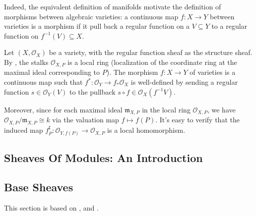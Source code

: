 \documentclass[11pt]{article}
\begin{document}
Indeed, the equivalent definition of manifolds motivate the definition of morphisms between algebraic 
varieties: a continuous map $ f:X \to Y $  between varieties is a morphism if it pull back a regular function on 
a $ V \subseteq Y$ to a regular function on $ f^{-1}(V) \subseteq X $. 

\begin{example}
  Let $ (X, \mathscr{O}_{X}) $ be a variety, with the regular function sheaf as the structure sheaf. 
  By \cite[Theorem 3.2, 3.4]{hartsAG}, the stalks $ \mathscr{O}_{X,P} $ is a local ring 
  (localization of the coordinate ring at the maximal ideal corresponding to $ P $). 
  The morphism $ f: X \to Y $ of varieties is a continuous map such that 
  $ f^{*} : \mathscr{O}_{Y} \to f_{*}\mathscr{O}_{X} $ is well-defined by sending a regular function 
  $ s \in \mathscr{O}_{Y}(V) $ to the pullback $ s \circ f \in \mathscr{O}_{X}(f^{-1}V) $. 

  Moreover, since for each maximal ideal $ \mathfrak{m}_{X,P} $ in the local ring $ \mathscr{O}_{X,P} $, 
  we have $  \mathscr{O}_{X,P} / \mathfrak{m}_{X,P} \cong k $ via the valuation map $ f \mapsto f(P) $. 
  It's easy to verify that the induced map $ f^{\sharp}_{P}: \mathscr{O}_{Y,f(P)} \to \mathscr{O}_{X,P} $ 
  is a local homomorphism. 
\end{example}

\subsection{Sheaves Of Modules: An Introduction}




\subsection{Base Sheaves}

This section is based on \cite[Proposition I-12]{EisenbudHarris}, 
\cite[2.5 Recovering sheaves from a ``sheaf on a base'']{vakilTheRisingSea} 
and \cite[6.30 Bases and sheaves]{stacks}. 
\end{document}
